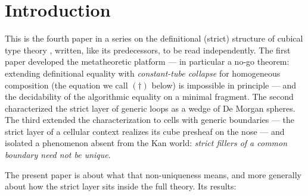 \documentclass[11pt]{amsart}
\theoremstyle{definition}
\begin{document}
\section{Introduction}
\label{sec:intro}

This is the fourth paper in a series on the definitional (strict)
structure of cubical type theory \cite{CCHM}, written, like its
predecessors, to be read independently.  The first paper
\cite{Const} developed the metatheoretic platform --- in particular
a no-go theorem: extending definitional equality with
\emph{constant-tube collapse} for homogeneous composition (the
equation we call $(\dagger)$ below) is impossible in principle ---
and the decidability of the algorithmic equality on a minimal
fragment.  The second \cite{Sphere} characterized the strict layer
of generic loops as a wedge of De Morgan spheres.  The third
\cite{Realization} extended the characterization to cells with
generic boundaries --- the strict layer of a cellular context
realizes its cube presheaf on the nose --- and isolated a phenomenon
absent from the Kan world: \emph{strict fillers of a common boundary
need not be unique}.

The present paper is about what that non-uniqueness means, and more
generally about how the strict layer sits inside the full theory.
Its results:
\end{document}
